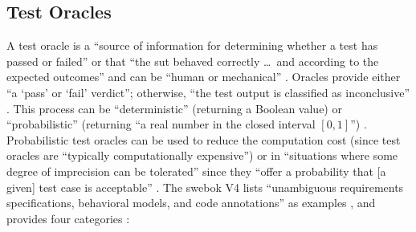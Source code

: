 \subsection{Test Oracles}
A test oracle is a ``source of information for determining whether a test has
passed or failed'' \citep[p.~13]{IEEE2022} or that ``the \acs{sut} behaved
correctly \dots\ and according to the expected outcomes'' and can be ``human or
mechanical'' \citep[p.~5-5]{SWEBOK2024}. Oracles provide either ``a
`pass' or `fail' verdict''; otherwise, ``the test output is classified as
inconclusive'' \citep[p.~5-5]{SWEBOK2024}. This process can be ``deterministic''
(returning a Boolean value) or ``probabilistic'' (returning ``a real number in
the closed interval $[0, 1]$'') \citep[p.~509]{BarrEtAl2015}. Probabilistic
test oracles can be used to reduce the computation cost (since test oracles
are ``typically computationally expensive'') \citep[p.~509]{BarrEtAl2015}
or in ``situations where some degree of imprecision can be tolerated'' since
they ``offer a probability that [a given] test case is acceptable''
\citep[p.~510]{BarrEtAl2015}. The \acs{swebok} V4 lists ``unambiguous requirements
specifications, behavioral models, and code annotations'' as examples
\citep[p.~5-5]{SWEBOK2024}, and \citeauthor{BarrEtAl2015} provides four
categories \citeyearpar[p.~510]{BarrEtAl2015}:

